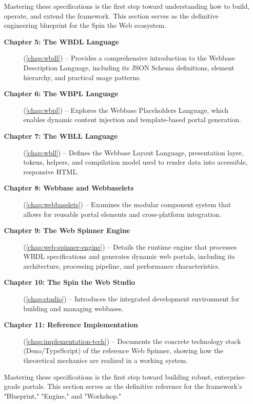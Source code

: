 Mastering these specifications is the first step toward understanding how to build, operate, and extend the framework. This section serves as the definitive engineering blueprint for the Spin the Web ecosystem.
\begin{description}
\item[\textbf{Chapter 5: The WBDL Language}] (\cref{chap:wbdl}) -- Provides a comprehensive introduction to the Webbase Description Language, including its JSON Schema definitions, element hierarchy, and practical usage patterns.

\item[\textbf{Chapter 6: The WBPL Language}] (\cref{chap:wbpl}) -- Explores the Webbase Placeholders Language, which enables dynamic content injection and template-based portal generation.

\item[\textbf{Chapter 7: The WBLL Language}] (\cref{chap:wbll}) -- Defines the Webbase Layout Language, presentation layer, tokens, helpers, and compilation model used to render data into accessible, responsive HTML.

\item[\textbf{Chapter 8: Webbase and Webbaselets}] (\cref{chap:webbaselets}) -- Examines the modular component system that allows for reusable portal elements and cross-platform integration.

\item[\textbf{Chapter 9: The Web Spinner Engine}] (\cref{chap:web-spinner-engine}) -- Details the runtime engine that processes WBDL specifications and generates dynamic web portals, including its architecture, processing pipeline, and performance characteristics.

\item[\textbf{Chapter 10: The Spin the Web Studio}] (\cref{chap:studio}) -- Introduces the integrated development environment for building and managing webbases.

\item[\textbf{Chapter 11: Reference Implementation}] (\cref{chap:implementation-tech}) -- Documents the concrete technology stack (Deno/TypeScript) of the reference Web Spinner, showing how the theoretical mechanics are realized in a working system.
\end{description}

Mastering these specifications is the first step toward building robust, enterprise-grade portals. This section serves as the definitive reference for the framework's "Blueprint," "Engine," and "Workshop."

